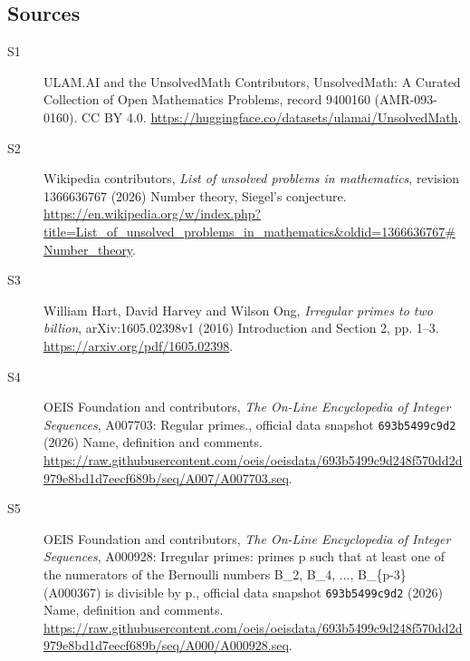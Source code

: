 \documentclass[11pt]{article}
\begin{document}
\subsection{Sources}
\begin{description}
\item[\hypertarget{source:9400160:1}{S1}] ULAM.AI and the UnsolvedMath Contributors, UnsolvedMath: A Curated Collection of Open Mathematics Problems, record 9400160 (AMR-093-0160). CC BY 4.0. \url{https://huggingface.co/datasets/ulamai/UnsolvedMath}.
\item[\hypertarget{source:9400160:2}{S2}] Wikipedia contributors, \emph{List of unsolved problems in mathematics}, revision 1366636767 (2026) Number theory, Siegel's conjecture. \url{https://en.wikipedia.org/w/index.php?title=List_of_unsolved_problems_in_mathematics&oldid=1366636767#Number_theory}.
\item[\hypertarget{source:9400160:3}{S3}] William Hart, David Harvey and Wilson Ong, \emph{Irregular primes to two billion}, arXiv:1605.02398v1 (2016) Introduction and Section 2, pp. 1--3. \url{https://arxiv.org/pdf/1605.02398}.
\item[\hypertarget{source:9400160:4}{S4}] OEIS Foundation and contributors, \emph{The On-Line Encyclopedia of Integer Sequences}, A007703: Regular primes., official data snapshot \texttt{693b5499c9d2} (2026) Name, definition and comments. \url{https://raw.githubusercontent.com/oeis/oeisdata/693b5499c9d248f570dd2d979e8bd1d7eecf689b/seq/A007/A007703.seq}.
\item[\hypertarget{source:9400160:5}{S5}] OEIS Foundation and contributors, \emph{The On-Line Encyclopedia of Integer Sequences}, A000928: Irregular primes: primes p such that at least one of the numerators of the Bernoulli numbers B\_2, B\_4, ..., B\_\{p-3\} (A000367) is divisible by p., official data snapshot \texttt{693b5499c9d2} (2026) Name, definition and comments. \url{https://raw.githubusercontent.com/oeis/oeisdata/693b5499c9d248f570dd2d979e8bd1d7eecf689b/seq/A000/A000928.seq}.
\end{description}
\label{end:9400160}
\end{document}
